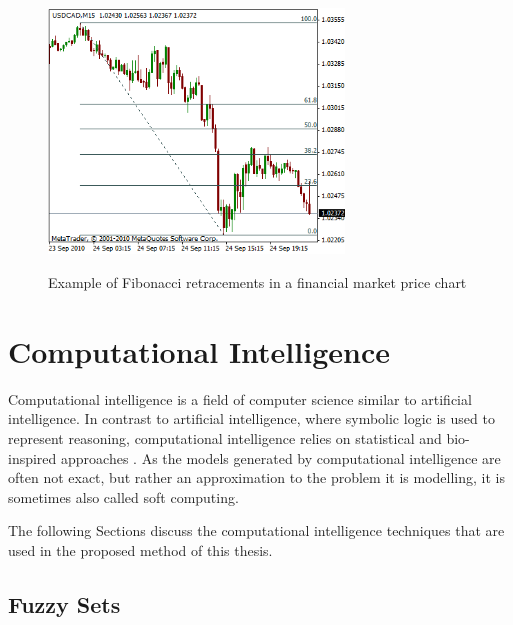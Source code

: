 \begin{figure}
\caption{Example of Fibonacci retracements in a financial market price chart}
\centering
\includegraphics[width=0.7\textwidth]{img/fibonacci-retracements.png}
\label{figure:fibonacci-retracements-in-financial-market}
\end{figure}

\section{Computational Intelligence}
\label{section:computational-intelligence}

Computational intelligence is a field of computer science similar to artificial
intelligence. In contrast to artificial intelligence, where symbolic logic is
used to represent reasoning, computational intelligence relies on statistical
and bio-inspired approaches
\cite{JangJyh-ShingRogerandSunChuen-TsaiandMizutaniEijiandHo1998}. As the models
generated by computational intelligence are often not exact, but rather an
approximation to the problem it is modelling, it is sometimes also called soft
computing.

The following Sections discuss the computational intelligence techniques that
are used in the proposed method of this thesis.

\subsection{Fuzzy Sets}
\label{subsection:fuzzy-sets}

